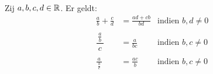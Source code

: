 \documentclass[numbers]{ximera}
\begin{document}
\begin{proposition}\label{breukensamenvatting} \ 
	
	Zij $a,b,c,d\in \mathbb{R}$. Er geldt:
	\begin{align*}
		\frac{a}{b}+\frac{c}{d}& =\frac{ad+cb}{bd} & \text{indien } b,d \neq 0 \\ \\
		\dfrac{\frac{a}{b}}{\ c\ }&=\frac{a}{bc}  & \text{indien }b,c \neq 0 \\ \\
		\frac{a}{\ \frac{b}{c}\ }&=\frac{ac}{b}  & \text{indien } b,c \neq 0 \\ \\
	\end{align*}
\end{proposition}
\end{document}
